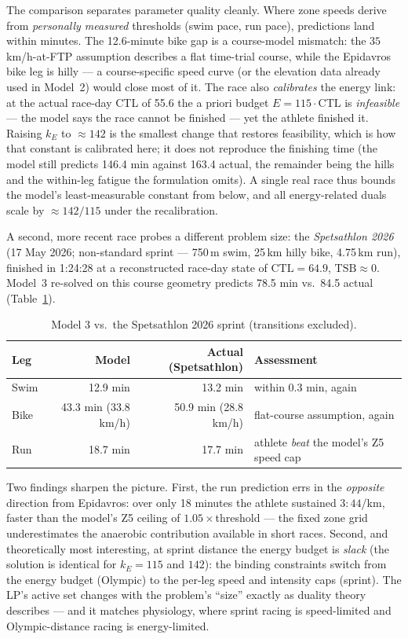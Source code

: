 \documentclass[11pt,a4paper]{article}
\begin{document}
The comparison separates parameter quality cleanly. Where zone speeds derive
from \emph{personally measured} thresholds (swim pace, run pace), predictions
land within minutes. The 12.6-minute bike gap is a course-model mismatch: the
$35$ km/h-at-FTP assumption describes a flat time-trial course, while the
Epidavros bike leg is hilly --- a course-specific speed curve (or the elevation
data already used in Model~2) would close most of it. The race also
\emph{calibrates} the energy link: at the actual race-day CTL of 55.6 the a
priori budget $E = 115 \cdot \text{CTL}$ is \emph{infeasible} --- the model says
the race cannot be finished --- yet the athlete finished it. Raising $k_E$ to
$\approx 142$ is the smallest change that restores feasibility, which is how
that constant is calibrated here; it does not reproduce the finishing time
(the model still predicts 146.4 min against 163.4 actual, the remainder being
the hills and the within-leg fatigue the formulation omits). A single real race
thus bounds the model's least-measurable constant from below, and all
energy-related duals scale by $\approx 142/115$ under the recalibration.

A second, more recent race probes a different problem size: the
\emph{Spetsathlon 2026} (17 May 2026; non-standard sprint --- 750\,m swim,
25\,km hilly bike, 4.75\,km run), finished in 1:24:28 at a reconstructed
race-day state of $\text{CTL}=64.9$, $\text{TSB}\approx 0$. Model~3 re-solved on
this course geometry predicts 78.5 min vs.\ 84.5 actual
(Table~\ref{tab:race2}).

\begin{table}[h]
\centering\small
\begin{tabular}{lrrl}
\toprule
Leg & Model & Actual (Spetsathlon) & Assessment\\
\midrule
Swim & 12.9 min & 13.2 min & within 0.3 min, again\\
Bike & 43.3 min (33.8 km/h) & 50.9 min (28.8 km/h) & flat-course assumption, again\\
Run & 18.7 min & 17.7 min & athlete \emph{beat} the model's Z5 speed cap\\
\bottomrule
\end{tabular}
\caption{Model 3 vs.\ the Spetsathlon 2026 sprint (transitions excluded).}
\label{tab:race2}
\end{table}

Two findings sharpen the picture. First, the run prediction errs in the
\emph{opposite} direction from Epidavros: over only 18 minutes the athlete
sustained $3{:}44$/km, faster than the model's Z5 ceiling of
$1.05\times$threshold --- the fixed zone grid underestimates the anaerobic
contribution available in short races. Second, and theoretically most
interesting, at sprint distance the energy budget is \emph{slack}
(the solution is identical for $k_E = 115$ and $142$): the binding constraints
switch from the energy budget (Olympic) to the per-leg speed and intensity caps
(sprint). The LP's active set changes with the problem's ``size'' exactly as
duality theory describes --- and it matches physiology, where sprint racing is
speed-limited and Olympic-distance racing is energy-limited.
\end{document}
